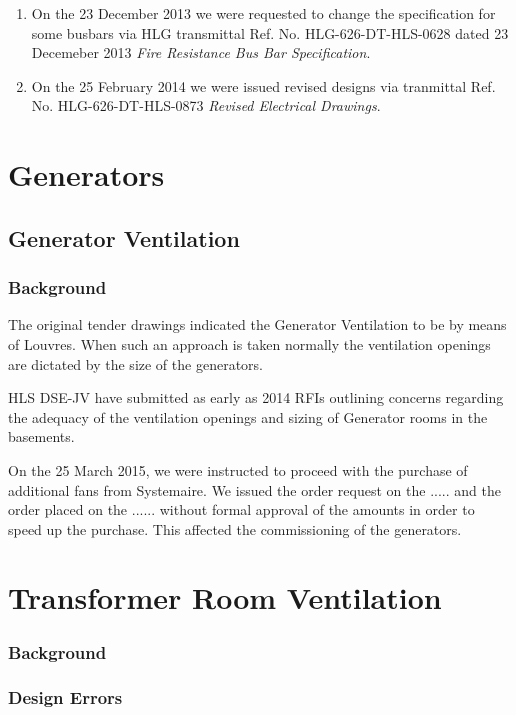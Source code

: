\begin{enumerate}
\item On the 23 December 2013 we were requested to change the specification for some busbars via HLG transmittal Ref. No. HLG-626-DT-HLS-0628 dated 23 Decemeber 2013 \textit{Fire Resistance Bus Bar Specification}.

\item On the 25 February 2014 we were issued revised designs via tranmittal Ref. No. HLG-626-DT-HLS-0873 \textit{Revised Electrical Drawings}.

\end{enumerate}


\chapter{Generators}

\section{Generator Ventilation}

\subsection{Background}

The original tender drawings indicated the Generator Ventilation to be by means of Louvres. When such an approach is taken normally the ventilation openings are dictated by the size of the generators.


HLS DSE-JV have submitted as early as 2014 RFIs outlining concerns regarding the adequacy of the ventilation openings and sizing of Generator rooms in the basements.

On the 25 March 2015, we were instructed to proceed with the purchase of additional fans from Systemaire. We issued the order request on the ..... and the order placed on the ......  without formal approval of the amounts in order to speed up the purchase. This affected the commissioning of the generators.

\chapter{Transformer Room Ventilation}

\subsection{Background}

\subsection{Design Errors}










